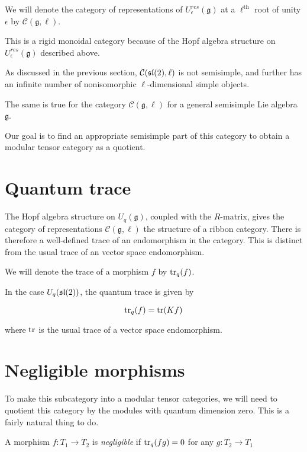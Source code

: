 We will denote the category of representations of $U_\epsilon^{res}(\mathfrak{g})$ at a
$\ell^\text{th}$ root of unity $\epsilon$ by $\mathcal{C}(\mathfrak{g}, \ell)$. 

This is a rigid monoidal category because of the Hopf algebra structure on
$U_\epsilon^{res}(\mathfrak{g})$ described above. 

As discussed in the previous section, $\mathcal{C}(\mathfrak{sl}(2),\ell)$ is not
semisimple, and further has an infinite number of nonisomorphic
$\ell$-dimensional simple objects.  

The same is true for the category $\mathcal{C}(\mathfrak{g}, \ell)$ for a
general semisimple Lie algebra $\mathfrak{g}$.

Our goal is to find an appropriate semisimple part of this category to obtain a
modular tensor category as a quotient.




\section{Quantum trace}

The Hopf algebra structure on $U_q(\mathfrak{g})$, coupled with the $R$-matrix,
gives the category of representations $\mathcal{C}(\mathfrak{g}, \ell)$ the
structure of a ribbon category. There is therefore a well-defined trace of an
endomorphism in the category. This is distinct from the usual trace of an
vector space endomorphism. 

We will denote the trace of a morphism $f$ by $\operatorname{tr}_q(f)$.

In the case $U_q(\mathfrak{sl}(2))$, the quantum trace is given by 

\begin{equation}
    \operatorname{tr}_q(f) = \operatorname{tr}(Kf)
\end{equation}

where $\operatorname{tr}$ is the usual trace of a vector space endomorphism.

\section{Negligible morphisms}
To make this subcategory into a modular tensor categories, we will need to
quotient this category by the modules with quantum dimension zero. This is a
fairly natural thing to do.  

\begin{defn}
    A morphism $f: T_1 \to T_2$ is \emph{negligible} if $\operatorname{tr}_q(fg) = 0$ for any $g: T_2 \to T_1$
\end{defn}


